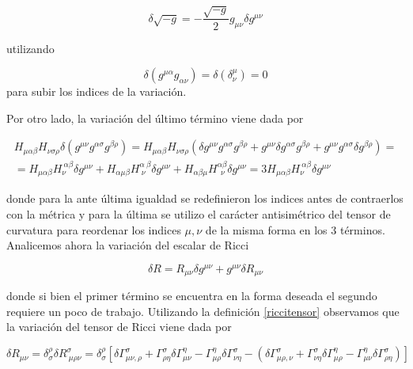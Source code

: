 \documentclass{article}
\numberwithin{equation}{section}
\begin{document}
\begin{equation}\label{vardet2}
\delta \sqrt{-g} = - \frac{\sqrt{-g}}{2} g_{\mu \nu} \delta g^{\mu \nu}
\end{equation}

utilizando

\begin{equation*}
\delta (g^{\mu\alpha}g_{\alpha\nu})= \delta \left( \delta^{\mu}_{\nu}\right) =0
\end{equation*}
para subir los indices de la variación.

Por otro lado, la variación del último término viene dada por

\begin{equation}\label{varh}
\begin{aligned}
 H_{\mu \alpha \beta}H_{\nu \sigma \rho} \delta \left( g^{\mu\nu} g^{\alpha\sigma} g^{\beta\rho}\right) = H_{\mu \alpha \beta}H_{\nu \sigma \rho} \left( \delta g^{\mu\nu} g^{\alpha\sigma} g^{\beta\rho} +g^{\mu\nu} \delta g^{\alpha\sigma} g^{\beta\rho} + g^{\mu\nu} g^{\alpha\sigma} \delta g^{\beta\rho}\right)=\\
= H_{\mu \alpha \beta}H_{\nu}^{ \ \alpha \beta} \delta g^{\mu \nu} + H_{\alpha \mu \beta}H_{ \ \nu \ }^{\alpha \ \beta} \delta g^{\mu \nu} + H_{\alpha \beta \mu}H_{ \ \ \nu \ }^{\alpha \beta} \delta g^{\mu \nu}  = 3 H_{\mu \alpha \beta} H_{\nu}^{ \ \alpha \beta} \delta g^{\mu\nu}
\end{aligned}
\end{equation}

donde para la ante última igualdad se redefinieron los indices antes de contraerlos con la métrica y para la última se utilizo el carácter antisimétrico del tensor de curvatura para reordenar los indices $ \mu , \nu $ de la misma forma en los 3 términos.\\

Analicemos ahora la variación del escalar de Ricci

\begin{equation}\label{varr}
\delta R = R_{\mu\nu}\delta g^{\mu\nu} + g^{\mu\nu} \delta R_{\mu\nu}
\end{equation}

donde si bien el primer término se encuentra en la forma deseada el segundo requiere un poco de trabajo. Utilizando la definición \ref{riccitensor} observamos que la variación del tensor de Ricci viene dada por
 
\begin{equation}\label{aux2}
\delta R_{\mu\nu} = \delta^{\rho}_{\sigma} \delta R^{\sigma}_{ \ \mu \rho \nu} = \delta^{\rho}_{\sigma} \left[\delta\Gamma^{\sigma}_{\mu \nu ,\rho } + \Gamma^{\sigma}_{ \rho \eta}\delta \Gamma^{\eta}_{\mu \nu }  - \Gamma^{\eta}_{\mu \rho } \delta  \Gamma^{\sigma}_{ \nu \eta} - \left( \delta\Gamma^{\sigma}_{\mu \rho ,\nu } + \Gamma^{\sigma}_{ \nu \eta} \delta \Gamma^{\eta}_{\mu \rho } - \Gamma^{\eta}_{\mu \nu } \delta  \Gamma^{\sigma}_{ \rho \eta}  \right) \right]
\end{equation}
 
\end{document}
